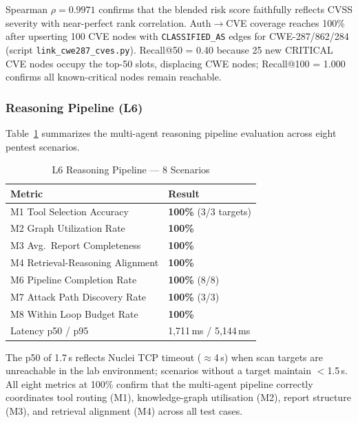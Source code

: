 \documentclass[conference]{IEEEtran}
\begin{document}
Spearman $\rho = 0.9971$ confirms that the blended risk score faithfully
reflects CVSS severity with near-perfect rank correlation.
Auth$\to$CVE coverage reaches 100\% after upserting 100 CVE nodes with
\texttt{CLASSIFIED\_AS} edges for CWE-287/862/284
(script \texttt{link\_cwe287\_cves.py}).
Recall@50 = 0.40 because 25 new CRITICAL CVE nodes occupy the top-50 slots,
displacing CWE nodes; Recall@100 = 1.000 confirms all known-critical nodes
remain reachable.

\subsubsection{Reasoning Pipeline (L6)}

Table~\ref{tab:l6} summarizes the multi-agent reasoning pipeline evaluation
across eight pentest scenarios.

\begin{table}[htbp]
  \centering
  \caption{L6 Reasoning Pipeline --- 8 Scenarios}
  \label{tab:l6}
  \begin{tabular}{ll}
    \toprule
    \textbf{Metric} & \textbf{Result} \\
    \midrule
    M1 Tool Selection Accuracy       & \textbf{100\%} (3/3 targets) \\
    M2 Graph Utilization Rate        & \textbf{100\%} \\
    M3 Avg.\ Report Completeness     & \textbf{100\%} \\
    M4 Retrieval-Reasoning Alignment & \textbf{100\%} \\
    M6 Pipeline Completion Rate      & \textbf{100\%} (8/8) \\
    M7 Attack Path Discovery Rate    & \textbf{100\%} (3/3) \\
    M8 Within Loop Budget Rate       & \textbf{100\%} \\
    Latency p50 / p95                & 1,711\,ms / 5,144\,ms \\
    \bottomrule
  \end{tabular}
\end{table}

The p50 of 1.7\,s reflects Nuclei TCP timeout ($\approx$4\,s) when scan
targets are unreachable in the lab environment; scenarios without a target
maintain $<$1.5\,s.
All eight metrics at 100\% confirm that the multi-agent pipeline correctly
coordinates tool routing (M1), knowledge-graph utilisation (M2), report
structure (M3), and retrieval alignment (M4) across all test cases.
\end{document}
